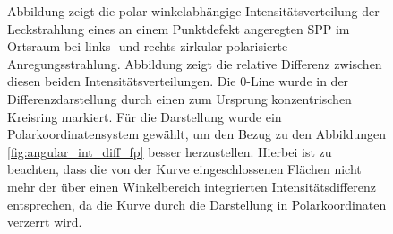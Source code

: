 \documentclass[titlepage,  ngerman]{article}
\begin{document}
\begin{figure}
			\caption{Abbildung  zeigt die polar-winkelabhängige Intensitätsverteilung der Leckstrahlung eines an einem Punktdefekt angeregten SPP im Ortsraum bei links- und rechts-zirkular polarisierte Anregungsstrahlung. Abbildung  zeigt die relative Differenz zwischen diesen beiden Intensitätsverteilungen. Die $0$-Line wurde in der Differenzdarstellung durch einen zum Ursprung konzentrischen Kreisring markiert. Für die Darstellung wurde ein Polarkoordinatensystem gewählt, um den Bezug zu den Abbildungen \ref{fig:angular_int_diff_fp} besser herzustellen. Hierbei ist zu beachten, dass die von der Kurve eingeschlossenen Flächen nicht mehr der über einen Winkelbereich integrierten Intensitätsdifferenz entsprechen, da die Kurve durch die Darstellung in Polarkoordinaten verzerrt wird.}
			\label{fig:angular_dist_fp}
		\end{figure}
	
		\FloatBarrier
\end{document}
